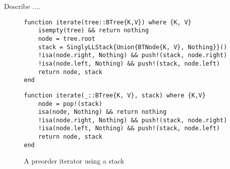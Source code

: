 \documentclass[a4paper, 11pt]{article}
\begin{document}
\begin{figure}[h]
\centering
{}
\end{figure}
Describe ....
    \begin{figure}[H]
        \centering
    \begin{verbatim}
function iterate(tree::BTree{K,V}) where {K, V}
    isempty(tree) && return nothing
    node = tree.root
    stack = SinglyLLStack{Union{BTNode{K, V}, Nothing}}()
    !isa(node.right, Nothing) && push!(stack, node.right)
    !isa(node.left, Nothing) && push!(stack, node.left)
    return node, stack
end
    \end{verbatim}
    \begin{verbatim}
function iterate(_::BTree{K, V}, stack) where {K,V}
    node = pop!(stack)
    isa(node, Nothing) && return nothing 
    !isa(node.right, Nothing) && push!(stack, node.right)
    !isa(node.left, Nothing) && push!(stack, node.left)
    return node, stack
end
    \end{verbatim}
    \caption{A preorder iterator using a stack}
    \label{code:preorderiterator}
    \end{figure}






    
\end{document}
